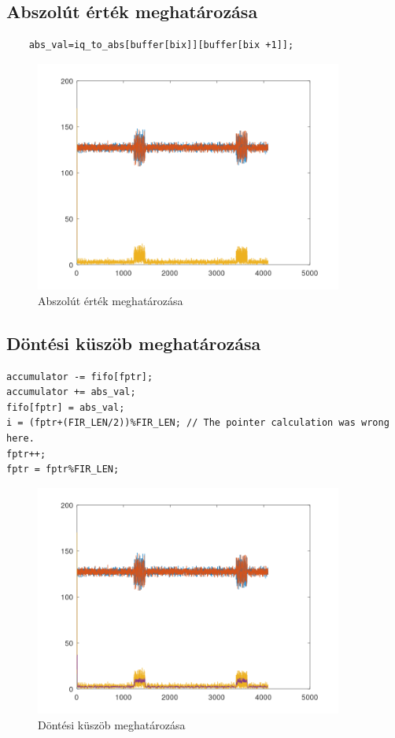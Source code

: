 \subsection{Abszolút érték meghatározása}
\begin{lstlisting}
    abs_val=iq_to_abs[buffer[bix]][buffer[bix +1]];
\end{lstlisting}
\begin{figure}[h]
    \centering
    \includegraphics[width=0.9\textwidth]{../meres/result/abs_value.png}
    \caption{Abszolút érték meghatározása}
    \label{fig:abs}
\end{figure}

\newpage
\subsection{Döntési küszöb meghatározása}
\begin{lstlisting}
accumulator -= fifo[fptr];
accumulator += abs_val;
fifo[fptr] = abs_val;
i = (fptr+(FIR_LEN/2))%FIR_LEN; // The pointer calculation was wrong here.
fptr++;
fptr = fptr%FIR_LEN;
\end{lstlisting}
\begin{figure}[h]
    \centering
    \includegraphics[width=0.9\textwidth]{../meres/result/dontes.png}
    \caption{Döntési küszöb meghatározása}
    \label{fig:deceison}
\end{figure}

